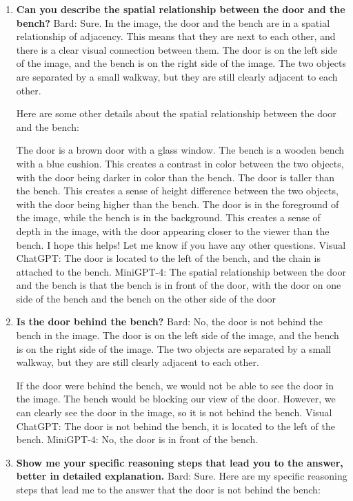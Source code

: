     \begin{enumerate}
        \item \textbf{Can you describe the spatial relationship between the door and the bench?}
        \subitem Bard: Sure. In the image, the door and the bench are in a spatial relationship of adjacency. This means that they are next to each other, and there is a clear visual connection between them. The door is on the left side of the image, and the bench is on the right side of the image. The two objects are separated by a small walkway, but they are still clearly adjacent to each other.

        Here are some other details about the spatial relationship between the door and the bench:
        
        The door is a brown door with a glass window. The bench is a wooden bench with a blue cushion. This creates a contrast in color between the two objects, with the door being darker in color than the bench.
        The door is taller than the bench. This creates a sense of height difference between the two objects, with the door being higher than the bench.
        The door is in the foreground of the image, while the bench is in the background. This creates a sense of depth in the image, with the door appearing closer to the viewer than the bench.
        I hope this helps! Let me know if you have any other questions.
        \subitem Visual ChatGPT: The door is located to the left of the bench, and the chain is attached to the bench.
        \subitem MiniGPT-4: The spatial relationship between the door and the bench is that the bench is in front of the door, with the door on one side of the bench and the bench on the other side of the door
        \item \textbf{Is the door behind the bench?}
        \subitem Bard: No, the door is not behind the bench in the image. The door is on the left side of the image, and the bench is on the right side of the image. The two objects are separated by a small walkway, but they are still clearly adjacent to each other.

        If the door were behind the bench, we would not be able to see the door in the image. The bench would be blocking our view of the door. However, we can clearly see the door in the image, so it is not behind the bench.
        \subitem Visual ChatGPT: The door is not behind the bench, it is located to the left of the bench.
        \subitem MiniGPT-4: No, the door is in front of the bench.
        \item \textbf{Show me your specific reasoning steps that lead you to the answer, better in detailed explanation.}
        \subitem Bard: Sure. Here are my specific reasoning steps that lead me to the answer that the door is not behind the bench:


\end{enumerate}
